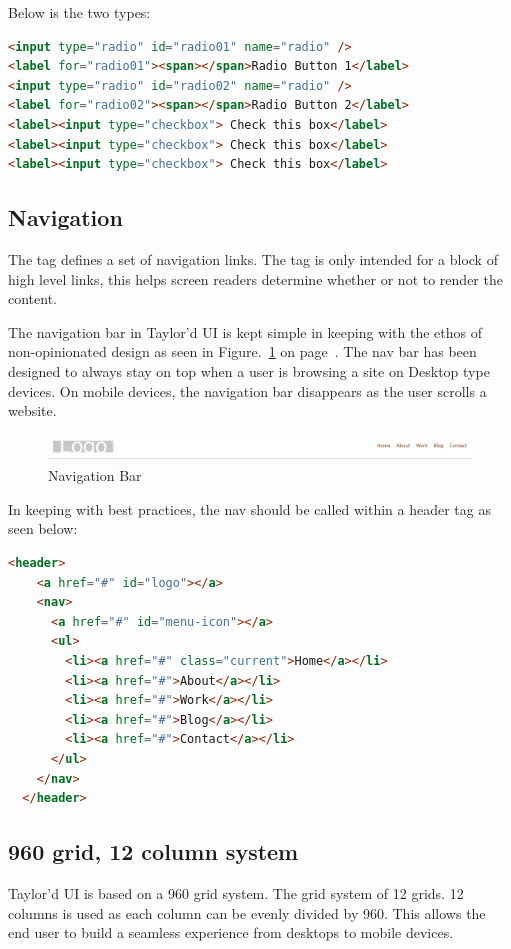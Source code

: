 Below is the two types: 

\begin{lstlisting}[language=HTML]
<input type="radio" id="radio01" name="radio" />
<label for="radio01"><span></span>Radio Button 1</label>
<input type="radio" id="radio02" name="radio" />
<label for="radio02"><span></span>Radio Button 2</label>
<label><input type="checkbox"> Check this box</label>
<label><input type="checkbox"> Check this box</label>
<label><input type="checkbox"> Check this box</label>
\end{lstlisting}

\newpage
\subsection*{Navigation}
The  tag defines a set of navigation links. The  tag is only intended for a block of high level links, this helps screen readers determine whether or not to render the content.

The navigation bar in Taylor'd UI is kept simple in keeping with the ethos of non-opinionated design as seen in Figure.~\ref{fig:nav} on  page~\pageref{fig:nav}. The nav bar has been designed to always stay on top when a user is browsing a site on Desktop type devices. On mobile devices, the navigation bar disappears as the user scrolls a website. 

\begin{figure}[h]
\centering
  \includegraphics[scale=0.2]{images/nav}
  \caption{Navigation Bar}
  \label{fig:nav}
\end{figure} 

In keeping with best practices, the nav should be called within a header tag as seen below:

\begin{lstlisting}[language=HTML]
  <header>
    <a href="#" id="logo"></a>
    <nav>
      <a href="#" id="menu-icon"></a>
      <ul>
        <li><a href="#" class="current">Home</a></li>
        <li><a href="#">About</a></li>
        <li><a href="#">Work</a></li>
        <li><a href="#">Blog</a></li>
        <li><a href="#">Contact</a></li>
      </ul>
    </nav>
  </header>
\end{lstlisting}

\newpage
\subsection*{960 grid, 12 column system}
Taylor'd UI is based on a 960 grid system. The grid system of 12 grids. 12 columns is used as each column can be evenly divided by 960. This allows the end user to build a seamless experience from desktops to mobile devices.


